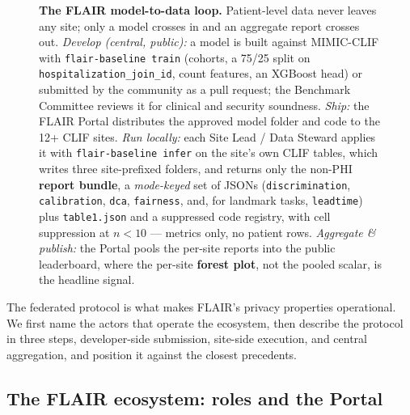 \begin{figure}[t!]
{}
  \caption{\textbf{The FLAIR model-to-data loop.} Patient-level data never
  leaves any site; only a model crosses in and an aggregate report crosses
  out. \emph{Develop (central, public):} a model is built against MIMIC-CLIF
  with \texttt{flair-baseline train} (cohorts, a 75/25 split on
  \texttt{hospitalization\_join\_id}, count features, an XGBoost head) or
  submitted by the community as a pull request; the Benchmark Committee
  reviews it for clinical and security soundness. \emph{Ship:} the FLAIR
  Portal distributes the approved model folder and code to the 12+ CLIF
  sites. \emph{Run locally:} each Site Lead / Data Steward applies it with
  \texttt{flair-baseline infer} on the site's own CLIF tables, which writes
  three site-prefixed folders, and returns only the non-PHI \textbf{report
  bundle}, a \emph{mode-keyed} set of JSONs (\texttt{discrimination},
  \texttt{calibration}, \texttt{dca}, \texttt{fairness}, and, for landmark
  tasks, \texttt{leadtime}) plus \texttt{table1.json} and a suppressed code
  registry, with cell suppression at $n<10$ --- metrics only, no patient
  rows. \emph{Aggregate \& publish:} the Portal pools the per-site reports
  into the public leaderboard, where the per-site \textbf{forest plot}, not
  the pooled scalar, is the headline signal.}
  \label{fig:workflow}
\end{figure}

The federated protocol is what makes FLAIR's privacy properties
operational. We first name the actors that operate the ecosystem, then
describe the protocol in three steps, developer-side submission,
site-side execution, and central aggregation, and position it
against the closest precedents.

\subsection*{The FLAIR ecosystem: roles and the Portal}

